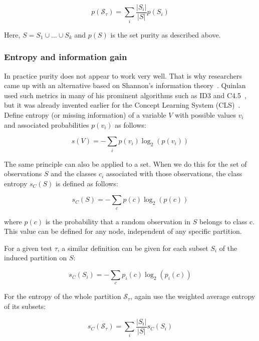 \begin{equation}
    p(\mathcal{S}_\tau) = \sum_i \frac{|S_i|}{|S|} p(S_i)
\end{equation}

Here, $S = S_1 \cup \ldots \cup S_k$ and $p(S)$ is the set purity as described above.

\subsubsection{Entropy and information gain}
In practice purity does not appear to work very well. That is why researchers came up with an alternative based on Shannon's information theory~\cite{shannon1948mathematical}. Quinlan used such metrics in many of his prominent algorithms such as ID3 and C4.5~\cite{id3ter, c45}, but it was already invented earlier for the Concept Learning System (CLS)~\cite{cls}. Define entropy (or missing information) of a variable $V$ with possible values $v_i$ and associated probabilities $p(v_i)$ as follows:

\begin{equation}
    s(V) = - \sum_i p(v_i) \log_2(p(v_i))
\end{equation}

The same principle can also be applied to a set. When we do this for the set of observations $S$ and the classes $c_i$ associated with those observations, the class entropy $s_C(S)$ is defined as follows:

\begin{equation}
    s_C(S) = - \sum_c p(c) \log_2(p(c))
\end{equation}

where $p(c)$ is the probability that a random observation in $S$ belongs to class c. This value can be defined for any node, independent of any specific partition.

For a given test $\tau$, a similar definition can be given for each subset $S_i$ of the induced partition on $S$:

\begin{equation}
    s_C(S_i) = - \sum_c p_i(c) \log_2(p_i(c))
\end{equation}

For the entropy of the whole partition $\mathcal{S}_\tau$, again use the weighted average entropy of its subsets:

\begin{equation}
    s_C(\mathcal{S}_\tau) = \sum_i \frac{|S_i|}{|S|} s_C(S_i)
\end{equation}

